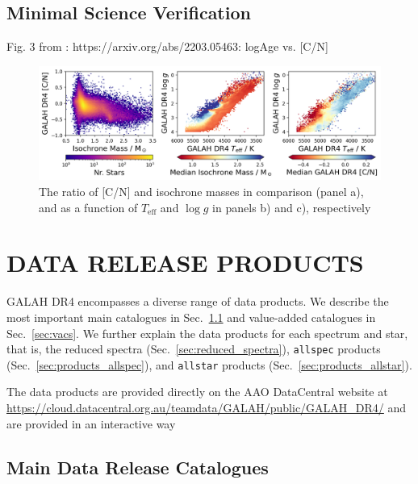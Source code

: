 \documentclass[
  journal=pasa,
  manuscript=research-paper, %
  year=2024,
  volume=37
]{cup-journal}
\newcommand{\Teff}{$T_\mathrm{eff}$\xspace}
\newcommand{\logg}{$\log g$\xspace}
\begin{document}
\subsection{Minimal Science Verification}

Fig. 3 from \citet{Spoo2022}: https://arxiv.org/abs/2203.05463: logAge vs. [C/N]

\begin{figure}
    \centering
    \includegraphics[width=\textwidth]{figures/cn_mass.png}
    \caption{The ratio of [C/N] and isochrone masses in comparison (panel a), and as a function of \Teff and \logg in panels b) and c), respectively}
    \label{fig:cn_mass}
\end{figure}

\section{DATA RELEASE PRODUCTS}
\label{sec:catalogues_release_products}

GALAH DR4 encompasses a diverse range of data products. We describe the most important main catalogues in Sec.~\ref{sec:data_release_catalogues} and value-added catalogues in Sec.~\ref{sec:vacs}. We further explain the data products for each spectrum and star, that is, the reduced spectra (Sec.~\ref{sec:reduced_spectra}), \texttt{allspec} products (Sec.~\ref{sec:products_allspec}), and \texttt{allstar} products (Sec.~\ref{sec:products_allstar}).

The data products are provided directly on the AAO DataCentral website at \url{https://cloud.datacentral.org.au/teamdata/GALAH/public/GALAH_DR4/} and are provided in an interactive way 

\subsection{Main Data Release Catalogues}
\label{sec:data_release_catalogues}
\end{document}
